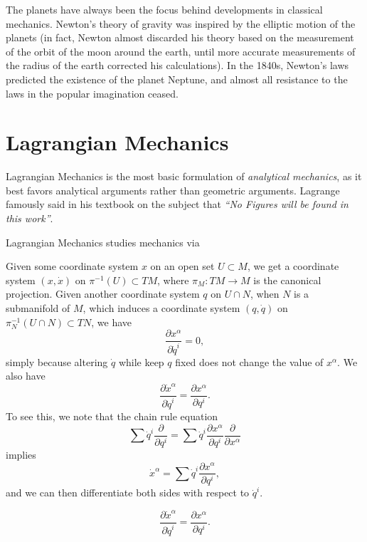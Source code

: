 The planets have always been the focus behind developments in classical mechanics. Newton's theory of gravity was inspired by the elliptic motion of the planets (in fact, Newton almost discarded his theory based on the measurement of the orbit of the moon around the earth, until more accurate measurements of the radius of the earth corrected his calculations). In the 1840s, Newton's laws predicted the existence of the planet Neptune, and almost all resistance to the laws in the popular imagination ceased.












\chapter{Lagrangian Mechanics}

Lagrangian Mechanics is the most basic formulation of \emph{analytical mechanics}, as it best favors analytical arguments rather than geometric arguments. Lagrange famously said in his textbook on the subject that \emph{``No Figures will be found in this work''}.

Lagrangian Mechanics studies mechanics via

Given some coordinate system $x$ on an open set $U \subset M$, we get a coordinate system $(x,\dot{x})$ on $\pi^{-1}(U) \subset TM$, where $\pi_M: TM \to M$ is the canonical projection. Given another coordinate system $q$ on $U \cap N$, when $N$ is a submanifold of $M$, which induces a coordinate system $(q,\dot{q})$ on $\pi_N^{-1}(U \cap N) \subset TN$, we have
%
\[ \frac{\partial x^\alpha}{\partial \dot{q}^i} = 0, \]
%
simply because altering $\dot{q}$ while keep $q$ fixed does not change the value of $x^\alpha$. We also have
%
\[ \frac{\partial \dot{x}^\alpha}{\partial \dot{q}^i} = \frac{\partial x^\alpha}{\partial q^i}. \]
%
To see this, we note that the chain rule equation
%
\[ \sum \dot{q}^i \frac{\partial}{\partial q^i} = \sum \dot{q}^i \frac{\partial x^\alpha}{\partial q^i} \frac{\partial}{\partial x^\alpha} \]
%
implies
%
\[ \dot{x}^\alpha = \sum \dot{q}^i \frac{\partial x^\alpha}{\partial q^i}, \]
%
and we can then differentiate both sides with respect to $\dot{q}^i$.

%
%
%

%
\[ \frac{\partial \dot{x}^\alpha}{\partial \dot{q}^i} = \frac{\partial x^\alpha}{\partial q^i}. \]
















